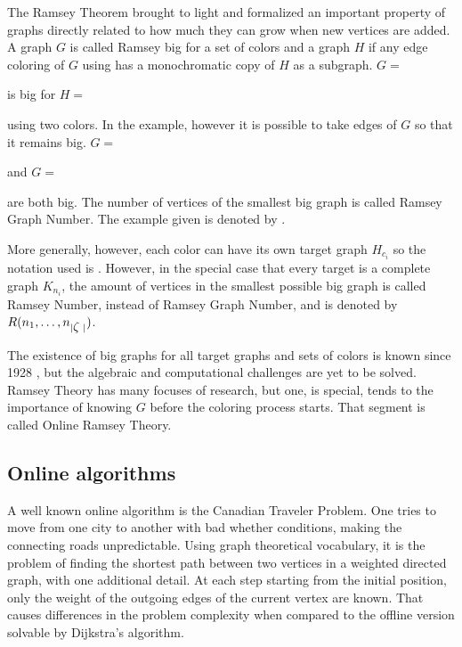 The Ramsey Theorem brought to light and formalized an important property of graphs  directly related to how much they can grow when new vertices are added. A graph $G$ is called Ramsey big for a set of colors  and a graph $H$ if any edge coloring of $G$ using  has a monochromatic copy of $H$ as a subgraph. $G = $ is big for $H = $
using two colors. In the example, however it is possible to take edges of $G$ so that it remains big. $G =\;$
and $G = $
 are both big. The number of vertices of the smallest big graph is called Ramsey Graph Number. The example given is denoted by .

More generally, however, each color can have its own target graph $H_{c_i}$ so the notation used is .
However, in the special case that every target is a complete graph $K_{n_i}$, the amount of vertices in the smallest possible big graph is called Ramsey Number, instead of Ramsey Graph Number, and is denoted by $R(n_1, \ldots, n_{|\mbox{$\zeta\;$}|})$. 

The existence of big graphs for all target graphs and sets of colors is known since 1928 , but the algebraic and computational challenges are yet to be solved. Ramsey Theory has many focuses of research, but one, is special, tends to the importance of knowing $G$ before the coloring process starts. That segment is called Online Ramsey Theory.

\subsection*{Online algorithms}

A well known online algorithm is the Canadian Traveler Problem. One tries to move from one city to another with bad whether conditions, making the connecting roads unpredictable. Using graph theoretical vocabulary, it is the problem of finding the shortest path between two vertices in a weighted directed graph, with one additional detail. At each step starting from the initial position, only the weight of the outgoing edges of the current vertex are known. That causes differences in the problem complexity when compared to the offline version solvable by Dijkstra's algorithm. 

